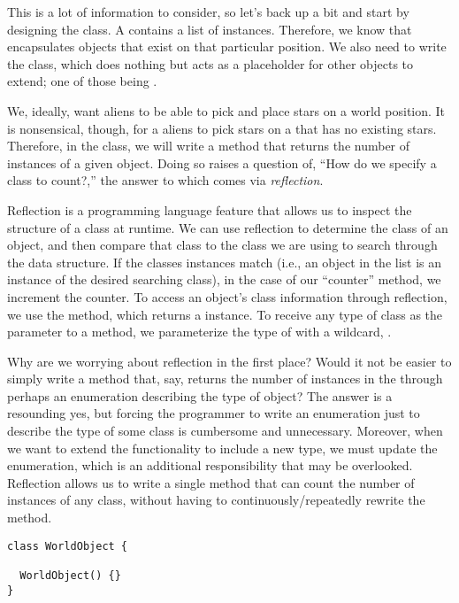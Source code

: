 This is a lot of information to consider, so let's back up a bit and start by designing the  class. 
A  contains a list of  instances. 
Therefore, we know that  encapsulates objects that exist on that particular position. 
We also need to write the  class, which does nothing but acts as a placeholder for other objects to extend; one of those being .

We, ideally, want aliens to be able to pick and place stars on a world position. 
It is nonsensical, though, for a aliens to pick stars on a  that has no existing stars. 
Therefore, in the  class, we will write a method that returns the number of instances of a given object. 
Doing so raises a question of, ``How do we specify a class to count?,'' the answer to which comes via \emph{reflection}. 

Reflection is a programming language feature that allows us to inspect the structure of a class at runtime. 
We can use reflection to determine the class of an object, and then compare that class to the class we are using to search through the data structure. 
If the classes instances match (i.e., an object in the list is an instance of the desired searching class), in the case of our ``counter'' method, we increment the counter. 
To access an object's class information through reflection, we use the  method, which returns a  instance. 
To receive any type of class as the parameter to a method, we parameterize the type of  with a wildcard, .

Why are we worrying about reflection in the first place? 
Would it not be easier to simply write a method that, say, returns the number of  instances in the  through perhaps an enumeration describing the type of object? 
The answer is a resounding yes, but forcing the programmer to write an enumeration just to describe the type of some class is cumbersome and unnecessary. 
Moreover, when we want to extend the functionality to include a new type, we must update the enumeration, which is an additional responsibility that may be overlooked. 
Reflection allows us to write a single method that can count the number of instances of any class, without having to continuously/repeatedly rewrite the method.

\begin{lstlisting}[language=MyJava]
class WorldObject {

  WorldObject() {}
}
\end{lstlisting}

